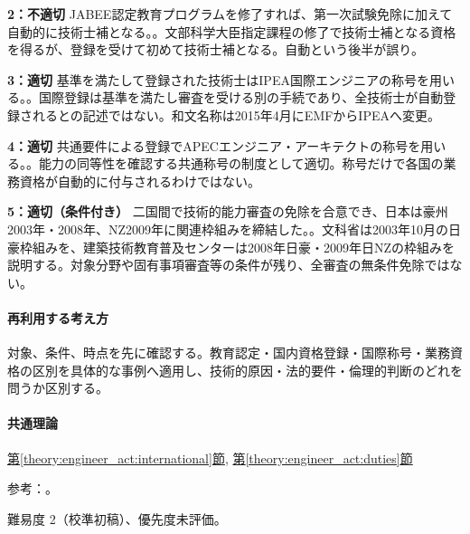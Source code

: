 \noindent\textbf{2：不適切} JABEE認定教育プログラムを修了すれば、第一次試験免除に加えて自動的に技術士補となる。。文部科学大臣指定課程の修了で技術士補となる資格を得るが、登録を受けて初めて技術士補となる。自動という後半が誤り。\par

\noindent\textbf{3：適切} 基準を満たして登録された技術士はIPEA国際エンジニアの称号を用いる。。国際登録は基準を満たし審査を受ける別の手続であり、全技術士が自動登録されるとの記述ではない。和文名称は2015年4月にEMFからIPEAへ変更。\par

\noindent\textbf{4：適切} 共通要件による登録でAPECエンジニア・アーキテクトの称号を用いる。。能力の同等性を確認する共通称号の制度として適切。称号だけで各国の業務資格が自動的に付与されるわけではない。\par

\noindent\textbf{5：適切（条件付き）} 二国間で技術的能力審査の免除を合意でき、日本は豪州2003年・2008年、NZ2009年に関連枠組みを締結した。。文科省は2003年10月の日豪枠組みを、建築技術教育普及センターは2008年日豪・2009年日NZの枠組みを説明する。対象分野や固有事項審査等の条件が残り、全審査の無条件免除ではない。\par

\paragraph{再利用する考え方} 対象、条件、時点を先に確認する。教育認定・国内資格登録・国際称号・業務資格の区別を具体的な事例へ適用し、技術的原因・法的要件・倫理的判断のどれを問うか区別する。

\paragraph{共通理論} \hyperref[theory:engineer_act:international]{第\ref*{theory:engineer_act:international}節}, \hyperref[theory:engineer_act:duties]{第\ref*{theory:engineer_act:duties}節}

\par 参考：\cite{engineer_act_current,ipej_associate_registration,jabee_canberra,ipej_ipea2014,mext_international,jaeic_mutual2010}。

\par 難易度 2（校準初稿）、優先度未評価。
